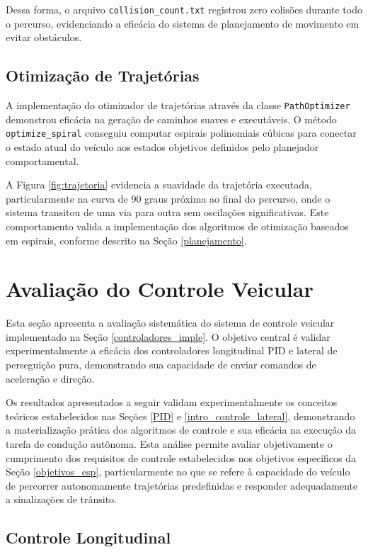 Dessa forma, o arquivo \texttt{collision\_count.txt} registrou zero colisões durante todo o percurso, evidenciando a eficácia do sistema de planejamento de movimento em evitar obstáculos.

\subsection{Otimização de Trajetórias} \label{subsec:otimizacao_trajetorias}

A implementação do otimizador de trajetórias através da classe \texttt{PathOptimizer} demonstrou eficácia na geração de caminhos suaves e executáveis. O método \texttt{optimize\_spiral} conseguiu computar espirais polinomiais cúbicas para conectar o estado atual do veículo aos estados objetivos definidos pelo planejador comportamental.

A Figura \ref{fig:trajetoria} evidencia a suavidade da trajetória executada, particularmente na curva de 90 graus próxima ao final do percurso, onde o sistema transitou de uma via para outra sem oscilações significativas. Este comportamento valida a implementação dos algoritmos de otimização baseados em espirais, conforme descrito na Seção \ref{planejamento}.

\section{Avaliação do Controle Veicular} \label{sec:avaliacao_controle}

Esta seção apresenta a avaliação sistemática do sistema de controle veicular implementado na Seção \ref{controladores_imple}. O objetivo central é validar experimentalmente a eficácia dos controladores longitudinal PID e lateral de perseguição pura, demonstrando sua capacidade de enviar comandos de aceleração e direção. 

Os resultados apresentados a seguir validam experimentalmente os conceitos teóricos estabelecidos nas Seções \ref{PID} e \ref{intro_controle_lateral}, demonstrando a materialização prática dos algoritmos de controle e sua eficácia na execução da tarefa de condução autônoma. Esta análise permite avaliar objetivamente o cumprimento dos requisitos de controle estabelecidos nos objetivos específicos da Seção \ref{objetivos_esp}, particularmente no que se refere à capacidade do veículo de percorrer autonomamente trajetórias predefinidas e responder adequadamente a sinalizações de trânsito.

\subsection{Controle Longitudinal} \label{subsec:controle_longitudinal}

